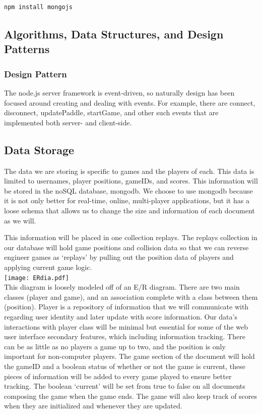 \documentclass[letterpaper,12pt]{article}
\begin{document}
\begin{verbatim}
npm install mongojs
\end{verbatim}

\subsection{Algorithms, Data Structures, and Design Patterns}
\subsubsection{Design Pattern}
The node.js server framework is event-driven, so naturally design has been focused around creating and dealing with events.
For example, there are connect, disconnect, updatePaddle, startGame, and other such events that are implemented both server- and client-side.

\subsection{Data Storage}
The data we are storing is specific to games and the players of each. This data is limited to usernames, player positions, gameIDs, and scores. This information will be stored in the noSQL database, mongodb. We choose to use mongodb because it is not only better for real-time, online, multi-player applications, but it has a loose schema that allows us to change the size and information of each document as we will.

This information will be placed in one collection replays. The replays collection in our database will hold game positions and collision data so that we can reverse engineer games as ‘replays’ by pulling out the position data of players and applying current game logic. \\

\texttt{[image: ERdia.pdf]} \\


This diagram is loosely modeled off of an E/R diagram. There are two main classes (player and game), and an association complete with a class between them (position). Player is a repository of information that we will communicate with regarding user identity and later update with score information. Our data’s interactions with player class will be minimal but essential for some of the web user interface secondary features, which including information tracking. There can be as little as no players a game up to two, and the position is only important for non-computer players. The game section of the document will hold the gameID and a boolean status of whether or not the game is current, these pieces of information will be added to every game played to ensure better tracking. The boolean ‘current’ will be set from true to false on all documents composing the game when the game ends. The game will also keep track of scores when they are initialized and whenever they are updated.
\end{document}
